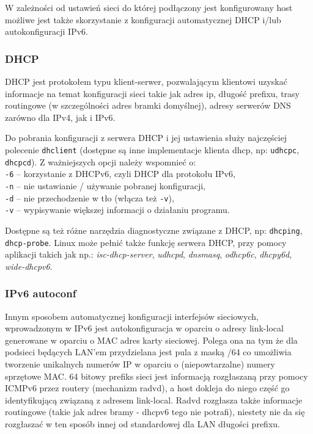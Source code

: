 W zależności od ustawień sieci do której podłączony jest konfigurowany host możliwe jest także skorzystanie z konfiguracji automatycznej DHCP i/lub autokonfiguracji IPv6.

\subsubsection{DHCP}

DHCP jest protokołem typu klient-serwer, pozwalającym klientowi uzyskać informacje na temat konfiguracji sieci takie jak adres ip, długość prefixu, trasy routingowe (w szczególności adres bramki domyślnej), adresy serwerów DNS zarówno dla IPv4, jak i IPv6.

Do pobrania konfiguracji z serwera DHCP i jej ustawienia służy najczęściej polecenie \Verb#dhclient# (dostępne są inne implementacje klienta dhcp, np: \Verb#udhcpc#, \Verb#dhcpcd#).
Z ważniejszych opcji należy wspomnieć o:\\
	\hspace*{1cm} \Verb#-6# – korzystanie z DHCPv6, czyli DHCP dla protokołu IPv6,\\
	\hspace*{1cm} \Verb#-n# – nie ustawianie / używanie pobranej konfiguracji,\\
	\hspace*{1cm} \Verb#-d# – nie przechodzenie w tło (włącza też \Verb#-v#),\\
	\hspace*{1cm} \Verb#-v# – wypisywanie większej informacji o działaniu programu.

Dostępne są też różne narzędzia diagnostyczne związane z DHCP, np: \Verb#dhcping#, \Verb#dhcp-probe#.
Linux może pełnić także funkcję serwera DHCP, przy pomocy aplikacji takich jak np.: 
	\textit{isc-dhcp-server}, \textit{udhcpd}, \textit{dnsmasq}, \textit{odhcp6c}, \textit{dhcpy6d}, \textit{wide-dhcpv6}.

\subsubsection{IPv6 autoconf}

Innym sposobem automatycznej konfiguracji interfejsów sieciowych, wprowadzonym w IPv6 jest autokonfiguracja w oparciu o adresy link-local generowane w oparciu o MAC adres karty sieciowej.
	Polega ona na tym że dla podsieci będących LAN'em przydzielana jest pula z maską /64 co umożliwia tworzenie unikalnych numerów IP w oparciu o (niepowtarzalne) numery sprzętowe MAC.
	64 bitowy prefiks sieci jest informacją rozgłaszaną przy pomocy ICMPv6 przez routery (mechanizm radvd), a host dokleja do niego część go identyfikującą związaną z adresem link-local.
	Radvd rozgłasza także informacje routingowe (takie jak adres bramy - dhcpv6 tego nie potrafi), niestety nie da się rozgłaszać w ten sposób innej od standardowej dla LAN długości prefixu.

